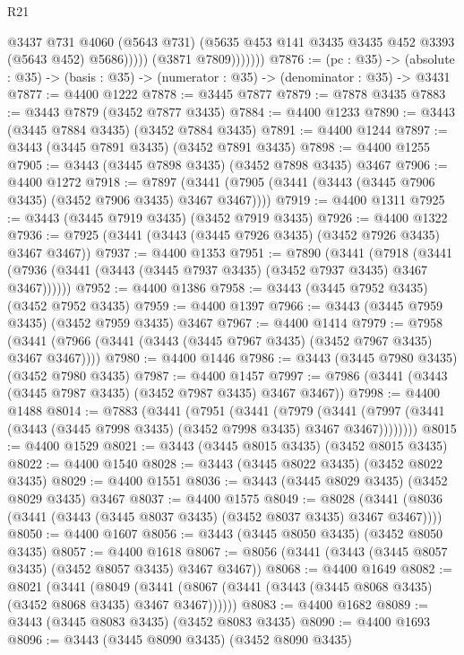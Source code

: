 \begin{lexlean}{R21}
\begin{coremodule}
                        @3437
                        @731
                        @4060
                        (@5643 @731)
                        (@5635 @453 @141 @3435 @3435 @452 @3393 (@5643 @452) @5686)))))
                (@3871 @7809)))))))
@7876 := (pc : @35) ->
  (absolute : @35) -> (basis : @35) -> (numerator : @35) -> (denominator : @35) -> @3431
@7877 := @4400 @1222
@7878 := @3445 @7877
@7879 := @7878 @3435
@7883 := @3443 @7879 (@3452 @7877 @3435)
@7884 := @4400 @1233
@7890 := @3443 (@3445 @7884 @3435) (@3452 @7884 @3435)
@7891 := @4400 @1244
@7897 := @3443 (@3445 @7891 @3435) (@3452 @7891 @3435)
@7898 := @4400 @1255
@7905 := @3443 (@3445 @7898 @3435) (@3452 @7898 @3435) @3467
@7906 := @4400 @1272
@7918 := @7897 (@3441 (@7905 (@3441 (@3443 (@3445 @7906 @3435) (@3452 @7906 @3435) @3467 @3467))))
@7919 := @4400 @1311
@7925 := @3443 (@3445 @7919 @3435) (@3452 @7919 @3435)
@7926 := @4400 @1322
@7936 := @7925 (@3441 (@3443 (@3445 @7926 @3435) (@3452 @7926 @3435) @3467 @3467))
@7937 := @4400 @1353
@7951 := @7890
    (@3441
      (@7918 (@3441 (@7936 (@3441 (@3443 (@3445 @7937 @3435) (@3452 @7937 @3435) @3467 @3467))))))
@7952 := @4400 @1386
@7958 := @3443 (@3445 @7952 @3435) (@3452 @7952 @3435)
@7959 := @4400 @1397
@7966 := @3443 (@3445 @7959 @3435) (@3452 @7959 @3435) @3467
@7967 := @4400 @1414
@7979 := @7958 (@3441 (@7966 (@3441 (@3443 (@3445 @7967 @3435) (@3452 @7967 @3435) @3467 @3467))))
@7980 := @4400 @1446
@7986 := @3443 (@3445 @7980 @3435) (@3452 @7980 @3435)
@7987 := @4400 @1457
@7997 := @7986 (@3441 (@3443 (@3445 @7987 @3435) (@3452 @7987 @3435) @3467 @3467))
@7998 := @4400 @1488
@8014 := @7883
    (@3441
      (@7951
        (@3441
          (@7979
            (@3441 (@7997 (@3441 (@3443 (@3445 @7998 @3435) (@3452 @7998 @3435) @3467 @3467))))))))
@8015 := @4400 @1529
@8021 := @3443 (@3445 @8015 @3435) (@3452 @8015 @3435)
@8022 := @4400 @1540
@8028 := @3443 (@3445 @8022 @3435) (@3452 @8022 @3435)
@8029 := @4400 @1551
@8036 := @3443 (@3445 @8029 @3435) (@3452 @8029 @3435) @3467
@8037 := @4400 @1575
@8049 := @8028 (@3441 (@8036 (@3441 (@3443 (@3445 @8037 @3435) (@3452 @8037 @3435) @3467 @3467))))
@8050 := @4400 @1607
@8056 := @3443 (@3445 @8050 @3435) (@3452 @8050 @3435)
@8057 := @4400 @1618
@8067 := @8056 (@3441 (@3443 (@3445 @8057 @3435) (@3452 @8057 @3435) @3467 @3467))
@8068 := @4400 @1649
@8082 := @8021
    (@3441
      (@8049 (@3441 (@8067 (@3441 (@3443 (@3445 @8068 @3435) (@3452 @8068 @3435) @3467 @3467))))))
@8083 := @4400 @1682
@8089 := @3443 (@3445 @8083 @3435) (@3452 @8083 @3435)
@8090 := @4400 @1693
@8096 := @3443 (@3445 @8090 @3435) (@3452 @8090 @3435)

\end{coremodule}
\end{lexlean}
